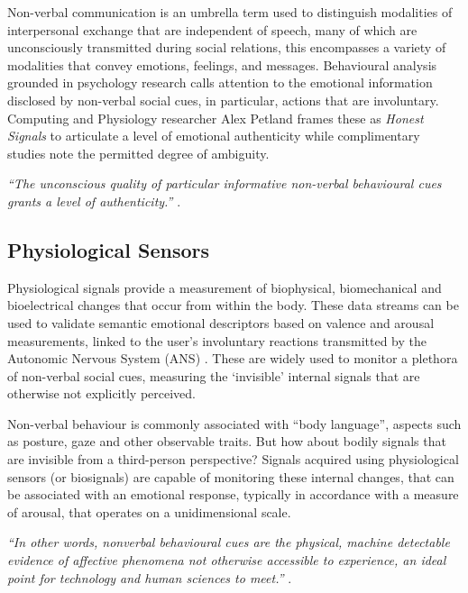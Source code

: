Non-verbal communication is an umbrella term used to distinguish modalities of interpersonal exchange that are independent of speech, many of which are unconsciously transmitted during social relations, this encompasses a variety of modalities that convey emotions, feelings, and messages. Behavioural analysis grounded in psychology research calls attention to the emotional information disclosed by non-verbal social cues, in particular, actions that are involuntary. Computing and Physiology researcher Alex Petland frames these as \textit{Honest Signals} to articulate a level of emotional authenticity while complimentary studies note the permitted degree of ambiguity.

\textit{``The unconscious quality of particular informative non-verbal behavioural cues grants a level of authenticity.''} \citeauthor{pentland_honest_2010} \cite{pentland_honest_2010}.

\subsection*{Physiological Sensors}
\label{subsec:physiological_sensors}

Physiological signals provide a measurement of biophysical, biomechanical and bioelectrical changes that occur from within the body. These data streams can be used to validate semantic emotional descriptors based on valence and arousal measurements, linked to the user’s involuntary reactions transmitted by the Autonomic Nervous System (ANS) \cite{levenson_autonomic_2014,shu_review_2018}. These are widely used to monitor a plethora of non-verbal social cues, measuring the ‘invisible’ internal signals that are otherwise not explicitly perceived.

Non-verbal behaviour is commonly associated with “body language”, aspects such as posture, gaze and other observable traits. But how about bodily signals that are invisible from a third-person perspective? Signals acquired using physiological sensors (or biosignals) are capable of monitoring these internal changes, that can be associated with an emotional response, typically in accordance with a measure of arousal, that operates on a unidimensional scale.

\textit{``In other words, nonverbal behavioural cues are the physical, machine detectable evidence of affective phenomena not otherwise accessible to experience, an ideal point for technology and human sciences to meet.''} \citeauthor{vinciarelli_towards_2011} \cite{vinciarelli_towards_2011}.

